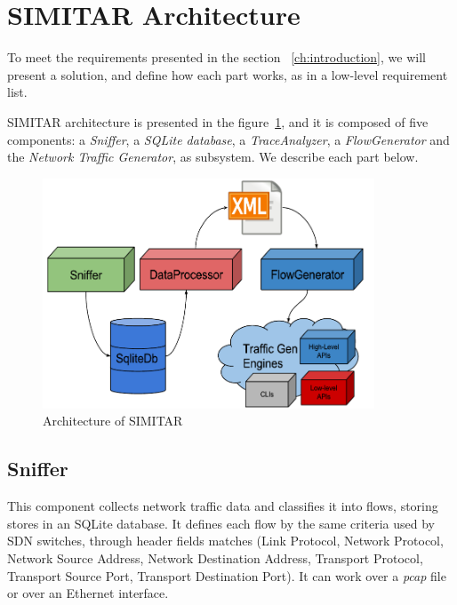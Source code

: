 \section{SIMITAR Architecture}

To meet the requirements presented in the section ~\ref{ch:introduction}, we will present a solution, and define how each part works, as in a low-level requirement list\cite{sommerville}.  

SIMITAR architecture is presented in the figure~\ref{fig:architecture}, and it is composed of five components: a \textit{Sniffer}, a \textit{SQLite database}, a \textit{TraceAnalyzer}, a \textit{FlowGenerator} and the \textit{Network Traffic Generator}, as subsystem. We describe each part below.

\begin{figure}[ht!]
        \centering
        \includegraphics[height=2.7in]{figures/ch3/architecture-diagram}
        \caption{Architecture of SIMITAR}
    \label{fig:architecture}
\end{figure}



\subsection{Sniffer}

This component collects network traffic data and classifies it into flows, storing stores in an SQLite database. It defines each flow by the same criteria used by SDN switches\cite{sdn-survey}, through header fields matches (Link Protocol, Network Protocol, Network Source Address, Network Destination Address, Transport Protocol, Transport Source Port, Transport Destination Port). It can work over a \textit{pcap} file or over an Ethernet interface. 

